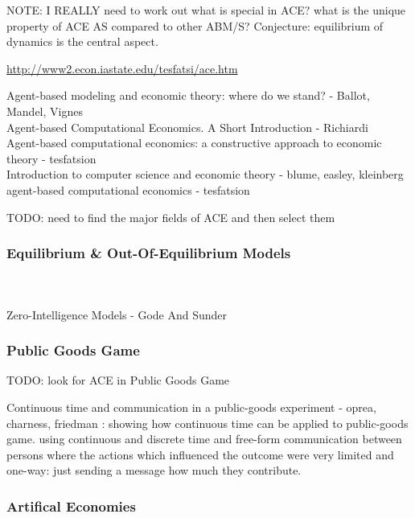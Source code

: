\documentclass{article}
\begin{document}
NOTE: I REALLY need to work out what is special in ACE? what is the unique property of ACE AS compared to other ABM/S? Conjecture: equilibrium of dynamics is the central aspect.


\url{http://www2.econ.iastate.edu/tesfatsi/ace.htm}

\cite{mandel_2015} Agent-based modeling and economic theory: where do we stand? - Ballot, Mandel, Vignes \\
\cite{richiardi_2007} Agent-based Computational Economics. A Short Introduction - Richiardi \\
\cite{tesfatsion_2006} Agent-based computational economics: a constructive approach to economic theory - tesfatsion \\
\cite{kleinberg_easley_2015} Introduction to computer science and economic theory - blume, easley, kleinberg \\
\cite{tesfatsion_2002} agent-based computational economics - tesfatsion 

TODO: need to find the major fields of ACE and then select them

\subsubsection{Equilibrium \& Out-Of-Equilibrium Models}
\cite{Botta20114025} \\
\cite{Gintis2006} \\
\cite{gode_sunder_1991} Zero-Intelligence Models - Gode And Sunder \\

\subsubsection{Public Goods Game}
TODO: look for ACE in Public Goods Game

Continuous time and communication in a public-goods experiment - oprea, charness, friedman \cite{friedman_2012}: showing how continuous time can be applied to public-goods game. using continuous and discrete time and free-form communication between persons where the actions which influenced the outcome were very limited and one-way: just sending a message how much they contribute.

\subsubsection{Artifical Economies}
\cite{gintis_dynamics_2007} \\
\cite{emergent_gaffeo_gatti_2008} \\
\cite{adaptive_gaffeo_gatti_2008} \\
\end{document}
